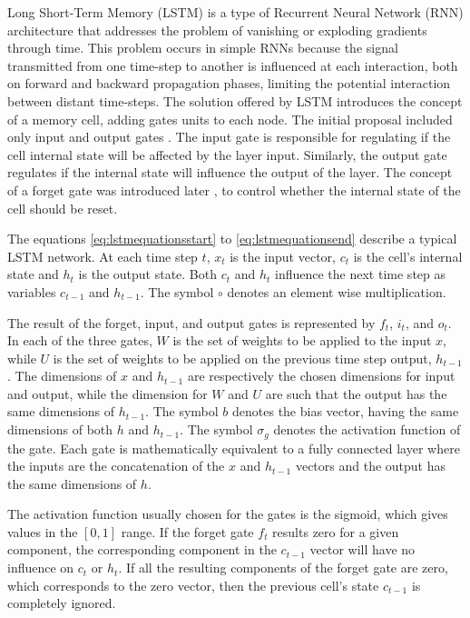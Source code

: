 Long Short-Term Memory\cite{hochreiter_long_1997} (LSTM) is a type of Recurrent Neural Network (RNN) architecture that addresses the problem of vanishing or exploding gradients through time. This problem occurs in simple RNNs because the signal transmitted from one time-step to another is influenced at each interaction, both on forward and backward propagation phases, limiting the potential interaction between distant time-steps. The solution offered by LSTM introduces the concept of a memory cell, adding gates units to each node. The initial proposal included only input and output gates \cite{hochreiter_long_1997}.
The input gate is responsible for regulating if the cell internal state will be affected by the layer input. Similarly, the output gate regulates if the internal state will influence the output of the layer. The concept of a forget gate was introduced later \cite{gers_learning_1999}, to control whether the internal state of the cell should be reset.

The equations \eqref{eq:lstmequationsstart} to \eqref{eq:lstmequationsend} describe a typical LSTM network. At each time step $t$, $x_t$ is the input vector, $c_t$ is the cell's internal state and $h_t$ is the output state. Both $c_t$ and $h_t$ influence the next time step as variables $c_{t-1}$ and $h_{t-1}$. The symbol $\circ$ denotes an element wise multiplication.

The result of the forget, input, and output gates is represented by $f_t$, $i_t$, and $o_t$.
In each of the three gates, $W$ is the set of weights to be applied to the input $x$, while $U$ is the set of weights to be applied on the previous time step output, $h_{t-1}$. 
The dimensions of $x$ and $h_{t-1}$ are respectively the chosen dimensions for input and output, while the dimension for $W$ and $U$ are such that the output has the same dimensions of $h_{t-1}$.  The symbol $b$ denotes the bias vector, having the same dimensions of both $h$ and $h_{t-1}$. The symbol $\sigma_g$ denotes the activation function of the gate. Each gate is mathematically equivalent to a fully connected layer where the inputs are the concatenation of the $x$ and $h_{t-1}$ vectors and the output has the same dimensions of $h$.

The activation function usually chosen for the gates is the sigmoid, which gives values in the $[0,1]$ range. If the forget gate $f_t$ results zero for a given component, the corresponding component in the $c_{t-1}$ vector will have no influence on $c_t$ or $h_t$. If all the resulting components of the forget gate are zero, which corresponds to the zero vector, then the previous cell's state $c_{t-1}$ is completely ignored.


